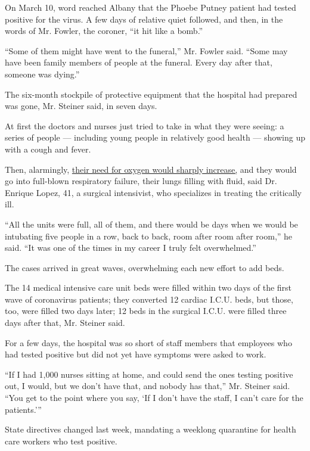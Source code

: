 On March 10, word reached Albany that the Phoebe Putney patient had
tested positive for the virus. A few days of relative quiet followed,
and then, in the words of Mr. Fowler, the coroner, ``it hit like a
bomb.''

``Some of them might have went to the funeral,'' Mr. Fowler said. ``Some
may have been family members of people at the funeral. Every day after
that, someone was dying.''

The six-month stockpile of protective equipment that the hospital had
prepared was gone, Mr. Steiner said, in seven days.

At first the doctors and nurses just tried to take in what they were
seeing: a series of people --- including young people in relatively good
health --- showing up with a cough and fever.

Then, alarmingly,
\href{https://abcnews.go.com/US/video-diaries-health-care-workers-document-fight-lives/story?id=69833398}{their
need for oxygen would sharply increase,} and they would go into
full-blown respiratory failure, their lungs filling with fluid, said Dr.
Enrique Lopez, 41, a surgical intensivist, who specializes in treating
the critically ill.

``All the units were full, all of them, and there would be days when we
would be intubating five people in a row, back to back, room after room
after room,'' he said. ``It was one of the times in my career I truly
felt overwhelmed.''

The cases arrived in great waves, overwhelming each new effort to add
beds.

The 14 medical intensive care unit beds were filled within two days of
the first wave of coronavirus patients; they converted 12 cardiac I.C.U.
beds, but those, too, were filled two days later; 12 beds in the
surgical I.C.U. were filled three days after that, Mr. Steiner said.

For a few days, the hospital was so short of staff members that
employees who had tested positive but did not yet have symptoms were
asked to work.

``If I had 1,000 nurses sitting at home, and could send the ones testing
positive out, I would, but we don't have that, and nobody has that,''
Mr. Steiner said. ``You get to the point where you say, `If I don't have
the staff, I can't care for the patients.'''

State directives changed last week, mandating a weeklong quarantine for
health care workers who test positive.

